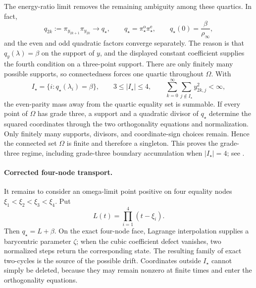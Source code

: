 \documentclass[11pt]{article}
\begin{document}
The energy-ratio limit removes the remaining ambiguity among these
quartics.  In fact,
\[
 q_{2k}:=\pi_{y_{2k+1}}\pi_{y_{2k}}\longrightarrow q_\star,\qquad
 q_\star=\pi_\star^{\mathrm o}\pi_\star^{\mathrm e},\qquad
 q_\star(0)=\frac{\beta}{\rho_\infty},
\]
and the even and odd quadratic factors converge separately.  The reason is
that \(q_y(\lambda)=\beta\) on the support of \(y\), and the displayed
constant coefficient supplies the fourth condition on a three-point
support.  There are only finitely many possible supports, so connectedness
forces one quartic throughout \(\Omega\).  With
\[
 I_\star=\{i:q_\star(\lambda_i)=\beta\},
 \qquad 3\leq\lvert I_\star\rvert\leq4,
 \qquad
 \sum_{k=0}^{\infty}\sum_{j\notin I_\star}y_{2k,j}^2<\infty,
\]
the even-parity mass away from the quartic equality set is summable.  If
every point of \(\Omega\) has grade three, a support and a quadratic divisor of
\(q_\star\) determine the squared coordinates through the two orthogonality
equations and normalization.  Only finitely many supports, divisors, and
coordinate-sign choices remain.  Hence the connected set \(\Omega\) is
finite and therefore a singleton.  This proves the grade-three regime,
including grade-three boundary accumulation when
\(\lvert I_\star\rvert=4\); see
.

\paragraph{Corrected four-node transport.}
It remains to consider an omega-limit point positive on four equality
nodes \(\xi_1<\xi_2<\xi_3<\xi_4\).  Put
\[
 L(t)=\prod_{i=1}^4(t-\xi_i).
\]
Then \(q_\star=L+\beta\).  On the exact four-node face, Lagrange
interpolation supplies a barycentric parameter \(\zeta\); when the cubic
coefficient defect vanishes, two normalized steps return the corresponding
state.  The resulting family of exact two-cycles is the source of the
possible drift.  Coordinates outside \(I_\star\) cannot simply be deleted,
because they may remain nonzero at finite times and enter the orthogonality
equations.
\end{document}
